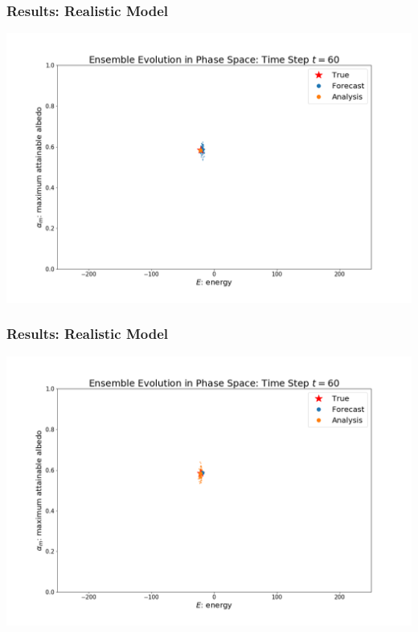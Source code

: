 \documentclass{beamer}
\begin{document}
\begin{frame}
\frametitle{Results: Realistic Model}
\centering
\includegraphics[width=\linewidth]{Figures/EnsembleEvolution_forecast_t=60.png}
\end{frame}
\begin{frame}
\frametitle{Results: Realistic Model}
\centering
\includegraphics[width=\linewidth]{Figures/EnsembleEvolution_analysis_t=60.png}
\end{frame}
\end{document}
